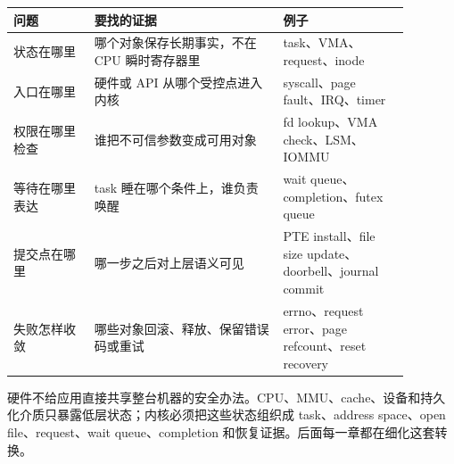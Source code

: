 \begin{longtable}{p{0.18\linewidth}p{0.42\linewidth}p{0.28\linewidth}}
\toprule
问题 & 要找的证据 & 例子 \\
\midrule
状态在哪里 & 哪个对象保存长期事实，不在 CPU 瞬时寄存器里 & task、VMA、request、inode \\
入口在哪里 & 硬件或 API 从哪个受控点进入内核 & syscall、page fault、IRQ、timer \\
权限在哪里检查 & 谁把不可信参数变成可用对象 & fd lookup、VMA check、LSM、IOMMU \\
等待在哪里表达 & task 睡在哪个条件上，谁负责唤醒 & wait queue、completion、futex queue \\
提交点在哪里 & 哪一步之后对上层语义可见 & PTE install、file size update、doorbell、journal commit \\
失败怎样收敛 & 哪些对象回滚、释放、保留错误码或重试 & errno、request error、page refcount、reset recovery \\
\bottomrule
\end{longtable}

\begin{keyidea}
硬件不给应用直接共享整台机器的安全办法。CPU、MMU、cache、设备和持久化介质只暴露低层状态；内核必须把这些状态组织成 task、address space、open file、request、wait queue、completion 和恢复证据。后面每一章都在细化这套转换。
\end{keyidea}
